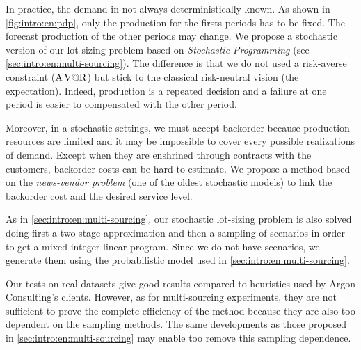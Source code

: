 \medskip


In practice, the demand in not always deterministically known.
As shown in \cref{fig:intro:en:pdp}, only the production for the firsts periods has to be fixed.
The forecast production of the other periods may change.
We propose a stochastic version of our lot-sizing problem based on \emph{Stochastic Programming} (see \cref{sec:intro:en:multi-sourcing}).
The difference is that we do not used a risk-averse constraint ($\operatorname{A\operatorname{V@R}}$) but stick to the classical risk-neutral vision (the expectation).
Indeed, production is a repeated decision and a failure at one period is easier to compensated with the other period.


Moreover, in a stochastic settings, we must accept backorder because production resources are limited and it may be impossible to cover every possible realizations of demand.
Except when they are enshrined through contracts with the customers, backorder costs can be hard to estimate.
We propose a method based on the \emph{news-vendor problem} (one of the oldest stochastic models) to link the backorder cost and the desired service level.


As in \cref{sec:intro:en:multi-sourcing}, our stochastic lot-sizing problem is also solved doing first a two-stage approximation and then a sampling of scenarios in order to get a mixed integer linear program.
Since we do not have scenarios, we generate them using the probabilistic model used in \cref{sec:intro:en:multi-sourcing}.


\medskip


Our tests on real datasets give good results compared to heuristics used by Argon Consulting's clients.
However, as for multi-sourcing experiments, they are not sufficient to prove the complete efficiency of the method because they are also too dependent on the sampling methods.
The same developments as those proposed in \cref{sec:intro:en:multi-sourcing} may enable too remove this sampling dependence.

